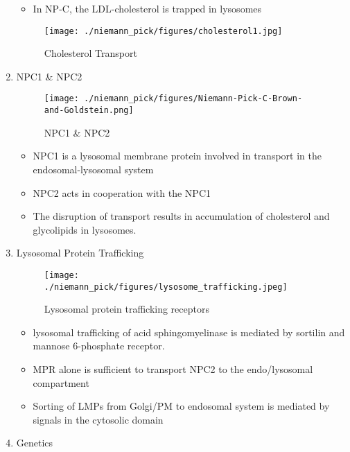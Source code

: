 \documentclass{scrartcl}
\begin{document}
\begin{enumerate}
\begin{itemize}
\item In NP-C, the LDL-cholesterol is trapped in lysosomes
\end{itemize}

\begin{figure}[htbp]
\centering
\texttt{[image: ./niemann\_pick/figures/cholesterol1.jpg]}
\caption{\label{fig:orgbed2a8a}
Cholesterol Transport}
\end{figure}


\item NPC1 \& NPC2
\label{sec:org72cca02}

\begin{figure}[htbp]
\centering
\texttt{[image: ./niemann\_pick/figures/Niemann-Pick-C-Brown-and-Goldstein.png]}
\caption{\label{fig:org9ac4e4e}
NPC1 \& NPC2}
\end{figure}

\begin{itemize}
\item NPC1 is a lysosomal membrane protein involved in transport in the endosomal-lysosomal system
\item NPC2 acts in cooperation with the NPC1
\item The disruption of transport results in accumulation of cholesterol and glycolipids in lysosomes.
\end{itemize}

\item Lysosomal Protein Trafficking
\label{sec:org270ed08}

\begin{figure}[htbp]
\centering
\texttt{[image: ./niemann\_pick/figures/lysosome\_trafficking.jpeg]}
\caption{\label{fig:orgcef5b9a}
Lysosomal protein trafficking receptors}
\end{figure}

\begin{itemize}
\item lysosomal trafficking of acid sphingomyelinase is mediated by sortilin and mannose 6-phosphate receptor.
\item MPR alone is sufficient to transport NPC2 to the endo/lysosomal compartment
\item Sorting of LMPs from Golgi/PM to endosomal system is mediated by
signals in the cytosolic domain
\end{itemize}

\item Genetics
\label{sec:orgcbbe4c0}


\end{enumerate}
\end{document}
